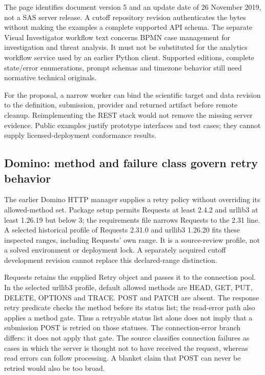 The page identifies document version 5 and an update date of 26 November
2019, not a SAS server release. A cutoff repository revision authenticates
the bytes without making the examples a complete supported API schema.
The separate Visual Investigator workflow text concerns BPMN case management
for investigation and threat analysis. It must not be substituted for the
analytics workflow service used by an earlier Python client. Supported
editions, complete state/error enumerations, prompt schemas and timezone
behavior still need normative technical originals.
\citep{exec24_workflow_contracts_sas}

For the proposal, a narrow worker can bind the scientific target and data
revision to the definition, submission, provider and returned artifact
before remote cleanup. Reimplementing the REST stack would not remove
the missing server evidence. Public examples justify prototype interfaces
and test cases; they cannot supply licensed-deployment conformance results.

\subsection{Domino: method and failure class govern retry behavior}

The earlier Domino HTTP manager supplies a retry policy without overriding
its allowed-method set. Package setup permits Requests at least 2.4.2 and
urllib3 at least 1.26.19 but below 3; the requirements file narrows Requests
to the 2.31 line. A selected historical profile of Requests 2.31.0 and
urllib3 1.26.20 fits these inspected ranges, including Requests' own range.
It is a source-review profile, not a solved environment or deployment lock.
A separately acquired cutoff development revision cannot replace this
declared-range distinction.~\citep{exec24_workflow_contracts_domino}

Requests retains the supplied Retry object and passes it to the connection
pool. In the selected urllib3 profile, default allowed methods are HEAD,
GET, PUT, DELETE, OPTIONS and TRACE. POST and PATCH are absent. The response
retry predicate checks the method before its status list; the read-error
path also applies a method gate. Thus a retryable status list alone does
not imply that a submission POST is retried on those statuses. The
connection-error branch differs: it does not apply that gate. The source
classifies connection failures as cases in which the server is thought not
to have received the request, whereas read errors can follow processing.
A blanket claim that POST can never be retried would also be too broad.
\citep{exec24_workflow_contracts_domino}

